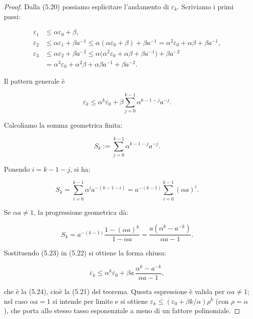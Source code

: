 \documentclass[italian, a4paper, twoside, binding=6mm]{sapthesis}
\begin{document}
\begin{proof}


Dalla (5.20) possiamo esplicitare l'andamento di $\varepsilon_k$. Scriviamo i primi passi:

\begin{align*}
\varepsilon_1 &\le \alpha \varepsilon_0 + \beta, \\
\varepsilon_2 &\le \alpha \varepsilon_1 + \beta a^{-1}
\le \alpha(\alpha \varepsilon_0 + \beta)+\beta a^{-1}
= \alpha^2 \varepsilon_0 + \alpha\beta + \beta a^{-1}, \\
\varepsilon_3 &\le \alpha \varepsilon_2 + \beta a^{-2}
\le \alpha\bigl(\alpha^2 \varepsilon_0 + \alpha\beta + \beta a^{-1}\bigr) + \beta a^{-2} \\
&= \alpha^3 \varepsilon_0 + \alpha^2\beta + \alpha\beta a^{-1} + \beta a^{-2}.
\end{align*}

Il pattern generale è

\begin{equation}
\varepsilon_k \le \alpha^k \varepsilon_0 + \beta \sum_{j=0}^{k-1} \alpha^{k-1-j} a^{-j}. \tag{5.22}
\end{equation}

Calcoliamo la somma geometrica finita:

\[
S_k := \sum_{j=0}^{k-1} \alpha^{k-1-j} a^{-j}.
\]

Ponendo $i = k-1-j$, si ha:

\[
S_k = \sum_{i=0}^{k-1} \alpha^{i} a^{-(k-1-i)}
= a^{-(k-1)} \sum_{i=0}^{k-1} (\alpha a)^i.
\]

Se $\alpha a \neq 1$, la progressione geometrica dà:

\begin{equation}
S_k = a^{-(k-1)} \frac{1 - (\alpha a)^k}{1 - \alpha a}
= \frac{a(\alpha^k - a^{-k})}{\alpha a - 1}. \tag{5.23}
\end{equation}

Sostituendo (5.23) in (5.22) si ottiene la forma chiusa:

\begin{equation}
\varepsilon_k \le \alpha^k \varepsilon_0 + \beta a\,\frac{\alpha^k - a^{-k}}{\alpha a - 1}, \tag{5.24}
\end{equation}

che è la (5.24), cioè la (5.21) del teorema. Questa espressione è valida per $\alpha a \neq 1$; nel caso $\alpha a = 1$ si intende per limite e si ottiene $\varepsilon_k \le (\varepsilon_0 + \beta k/\alpha)\rho^k$ (con $\rho = \alpha$), che porta allo stesso tasso esponenziale a meno di un fattore polinomiale.


\end{proof}
\end{document}
